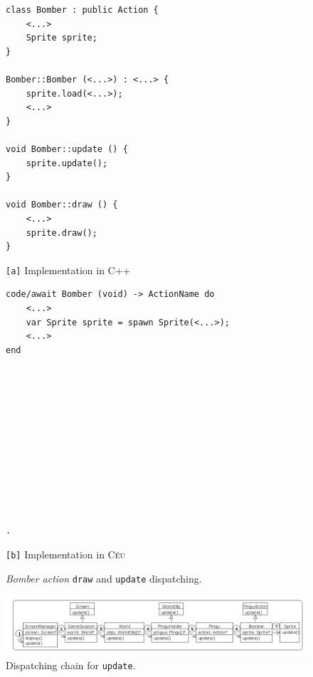 \documentclass[10pt, conference, compsocconf]{IEEEtran}
\newcommand{\CEU}{\textsc{C\'{e}u}\xspace}
\newcommand{\code}[1] {{\small{\texttt{#1}}}}
\newcommand{\ax}{\code{[a]}\xspace}
\newcommand{\bx}{\code{[b]}\xspace}
\begin{document}
\begin{figure}
\begin{minipage}[t]{0.50\linewidth}
\begin{lstlisting}[numbers=right]
class Bomber : public Action {
    <...>
    Sprite sprite;
}

Bomber::Bomber (<...>) : <...> {
    sprite.load(<...>);
    <...>
}

void Bomber::update () {
    sprite.update();
}

void Bomber::draw () {
    <...>
    sprite.draw();
}
\end{lstlisting}
\centering\small{\ax Implementation in C++}
\end{minipage}
%
\begin{minipage}[t]{0.50\linewidth}
\begin{lstlisting}[xleftmargin=2em]
code/await Bomber (void) -> ActionName do
    <...>
    var Sprite sprite = spawn Sprite(<...>);
    <...>
end












.
\end{lstlisting}
\centering\small{\bx Implementation in \CEU}
\end{minipage}
\caption{ \emph{Bomber action} \code{draw} and \code{update} dispatching.
\label{lst.hier}
}
\end{figure}

\begin{figure}
\centering
\includegraphics[width=\textwidth]{hierarchy}
\caption{Dispatching chain for \code{update}.
\label{fig.hier}
}
\end{figure}
\end{document}
